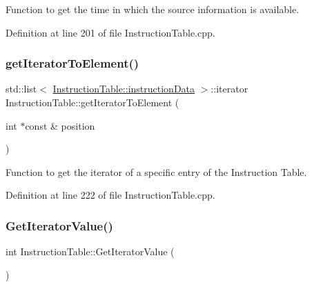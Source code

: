 Function to get the time in which the source information is available. 



Definition at line 201 of file Instruction\+Table.\+cpp.

\mbox{\label{classoctantis_1_1InstructionTable_a6894d7162a4f2aeb64de48a6c7f0e8ca}} 
\subsubsection{\texorpdfstring{get\+Iterator\+To\+Element()}{getIteratorToElement()}}
{\footnotesize\ttfamily std\+::list$<$ \hyperlink{structoctantis_1_1InstructionTable_1_1instructionData}{Instruction\+Table\+::instruction\+Data} $>$\+::iterator Instruction\+Table\+::get\+Iterator\+To\+Element (\begin{DoxyParamCaption}\item[{int $\ast$const \&}]{position }\end{DoxyParamCaption})}



Function to get the iterator of a specific entry of the Instruction Table. 



Definition at line 222 of file Instruction\+Table.\+cpp.

\mbox{\label{classoctantis_1_1InstructionTable_a17258726fc044c5fbc3a92bc0466b676}} 
\subsubsection{\texorpdfstring{Get\+Iterator\+Value()}{GetIteratorValue()}}
{\footnotesize\ttfamily int Instruction\+Table\+::\+Get\+Iterator\+Value (\begin{DoxyParamCaption}{ }\end{DoxyParamCaption})}



